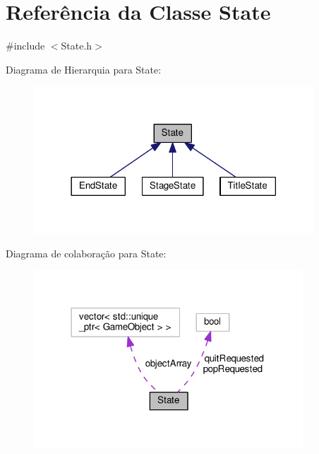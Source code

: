 \hypertarget{classState}{\section{Referência da Classe State}
\label{classState}
}


{\ttfamily \#include $<$State.\+h$>$}



Diagrama de Hierarquia para State\+:\nopagebreak
\begin{figure}[H]
\begin{center}
\leavevmode
\includegraphics[width=297pt]{classState__inherit__graph}
\end{center}
\end{figure}


Diagrama de colaboração para State\+:\nopagebreak
\begin{figure}[H]
\begin{center}
\leavevmode
\includegraphics[width=286pt]{classState__coll__graph}
\end{center}
\end{figure}
